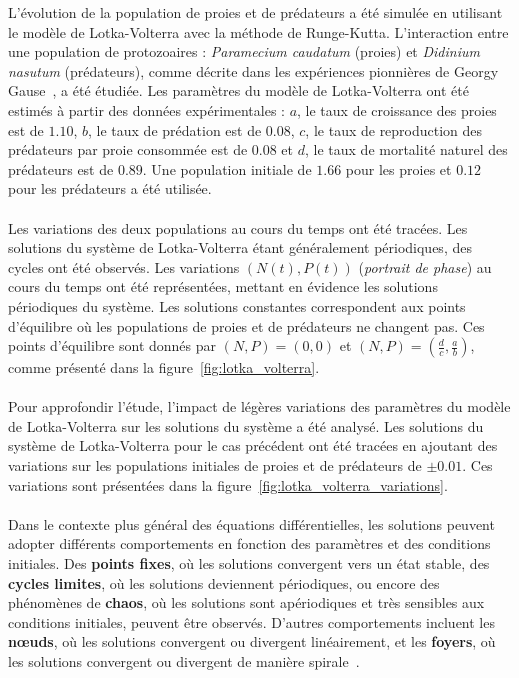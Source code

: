 \documentclass{article}
\begin{document}
L'évolution de la population de proies et de prédateurs a été simulée en utilisant le modèle de Lotka-Volterra avec la méthode de Runge-Kutta. L'interaction entre une population de protozoaires : \textit{Paramecium caudatum} (proies) et \textit{Didinium nasutum} (prédateurs), comme décrite dans les expériences pionnières de Georgy Gause~\cite{strauss2021gauser}, a été étudiée. Les paramètres du modèle de Lotka-Volterra ont été estimés à partir des données expérimentales : $a$, le taux de croissance des proies est de $1.10$, $b$, le taux de prédation est de $0.08$, $c$, le taux de reproduction des prédateurs par proie consommée est de $0.08$ et $d$, le taux de mortalité naturel des prédateurs est de $0.89$. Une population initiale de $1.66$ pour les proies et $0.12$ pour les prédateurs a été utilisée. \\ \\
Les variations des deux populations au cours du temps ont été tracées. Les solutions du système de Lotka-Volterra étant généralement périodiques, des cycles ont été observés. Les variations \((N(t), P(t))\) (\textit{portrait de phase}) au cours du temps ont été représentées, mettant en évidence les solutions périodiques du système. Les solutions constantes correspondent aux points d'équilibre où les populations de proies et de prédateurs ne changent pas. Ces points d'équilibre sont donnés par \((N, P) = (0, 0)\) et \((N, P) = \left(\frac{d}{c}, \frac{a}{b}\right)\), comme présenté dans la figure~\ref{fig:lotka_volterra}.\\ \\
Pour approfondir l'étude, l'impact de légères variations des paramètres du modèle de Lotka-Volterra sur les solutions du système a été analysé. Les solutions du système de Lotka-Volterra pour le cas précédent ont été tracées en ajoutant des variations sur les populations initiales de proies et de prédateurs de $\pm 0.01$. Ces variations sont présentées dans la figure~\ref{fig:lotka_volterra_variations}.\\ \\
Dans le contexte plus général des équations différentielles, les solutions peuvent adopter différents comportements en fonction des paramètres et des conditions initiales. Des \textbf{points fixes}, où les solutions convergent vers un état stable, des \textbf{cycles limites}, où les solutions deviennent périodiques, ou encore des phénomènes de \textbf{chaos}, où les solutions sont apériodiques et très sensibles aux conditions initiales, peuvent être observés. D'autres comportements incluent les \textbf{nœuds}, où les solutions convergent ou divergent linéairement, et les \textbf{foyers}, où les solutions convergent ou divergent de manière spirale~\cite{diener_sysdyn12}.
\end{document}
